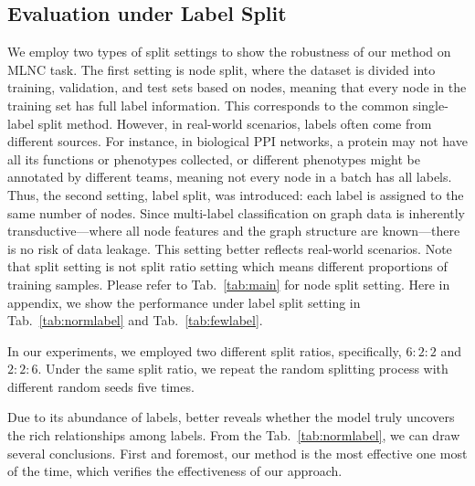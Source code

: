 \subsection{Evaluation under Label Split} \label{app:moreExp}
We employ two types of split settings to show the robustness of our method on MLNC task.
The first setting is node split, where the dataset is divided into training, validation, and test sets based on nodes, meaning that every node in the training set has full label information. This corresponds to the common single-label split method. However, in real-world scenarios, labels often come from different sources. For instance, in biological PPI networks, a protein may not have all its functions or phenotypes collected, or different phenotypes might be annotated by different teams, meaning not every node in a batch has all labels. Thus, the second setting, label split, was introduced: each label is assigned to the same number of nodes. Since multi-label classification on graph data is inherently transductive—where all node features and the graph structure are known—there is no risk of data leakage. This setting better reflects real-world scenarios.
Note that split setting is not split ratio setting which means different proportions of training samples.
Please refer to Tab.~\ref{tab:main} for node split setting. Here in appendix, we show the performance under label split setting in Tab.~\ref{tab:normlabel} and Tab.~\ref{tab:fewlabel}.


 In our experiments, we employed two different split ratios, specifically, $6:2:2$ and $2:2:6$. 
Under the same split ratio, we repeat the random splitting process with different random seeds five times.

Due to its abundance of labels, better reveals whether the model truly uncovers the rich relationships among labels. 
From the Tab.~\ref{tab:normlabel}, we can draw several conclusions. First and foremost, our method is the most effective one most of the time, which verifies the effectiveness of our approach. 

